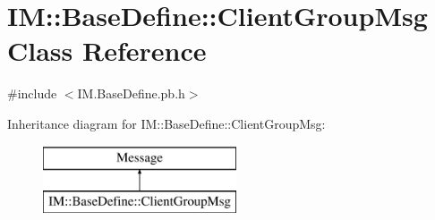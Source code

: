\hypertarget{class_i_m_1_1_base_define_1_1_client_group_msg}{}\section{I\+M\+:\+:Base\+Define\+:\+:Client\+Group\+Msg Class Reference}
\label{class_i_m_1_1_base_define_1_1_client_group_msg}


{\ttfamily \#include $<$I\+M.\+Base\+Define.\+pb.\+h$>$}

Inheritance diagram for I\+M\+:\+:Base\+Define\+:\+:Client\+Group\+Msg\+:\begin{figure}[H]
\begin{center}
\leavevmode
\includegraphics[height=2.000000cm]{class_i_m_1_1_base_define_1_1_client_group_msg}
\end{center}
\end{figure}
